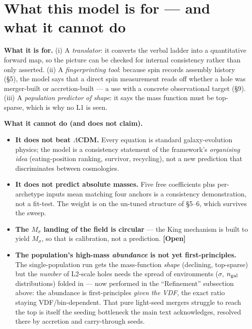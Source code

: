 \documentclass[11pt]{article}
\newcommand{\Open}{\textbf{\textcolor{gray!10!black}{[Open]}}}
\newcommand{\Msig}{M_\sigma}
\begin{document}
\section{What this model is for --- and what it cannot do}
\textbf{What it is for.} (i) A \emph{translator}: it converts the verbal ladder into a quantitative forward map, so the picture can be checked for internal consistency rather than only asserted. (ii) A \emph{fingerprinting tool}: because spin records assembly history (\S5), the model says that a direct spin measurement reads off whether a hole was merger-built or accretion-built --- a use with a concrete observational target (\S9). (iii) A \emph{population predictor of shape}: it says the mass function must be top-sparse, which is why no L1 is seen.

\textbf{What it cannot do (and does not claim).}
\begin{itemize}[leftmargin=1.3em,itemsep=2pt]
\item \textbf{It does not beat $\Lambda$CDM.} Every equation is standard galaxy-evolution physics; the model is a consistency statement of the framework's \emph{organising idea} (eating-position ranking, survivor, recycling), not a new prediction that discriminates between cosmologies.
\item \textbf{It does not predict absolute masses.} Five free coefficients plus per-archetype inputs mean matching four anchors is a consistency demonstration, not a fit-test. The weight is on the un-tuned structure of \S5--6, which survives the sweep.
\item \textbf{The $\Msig$ landing of the field is circular} --- the King mechanism is built to yield $\Msig$, so that is calibration, not a prediction. \Open
\item \textbf{The population's high-mass \emph{abundance} is not yet first-principles.} The single-population run gets the mass-function \emph{shape} (declining, top-sparse) but the \emph{number} of L2-scale holes needs the spread of environments ($\sigma$, $n_{\rm gal}$ distributions) folded in --- now performed in the ``Refinement'' subsection above: the abundance is first-principles \emph{given the VDF}, the exact ratio staying VDF/bin-dependent. That pure light-seed mergers struggle to reach the top is itself the seeding bottleneck the main text acknowledges, resolved there by accretion and carry-through seeds.
\end{itemize}

\end{document}
